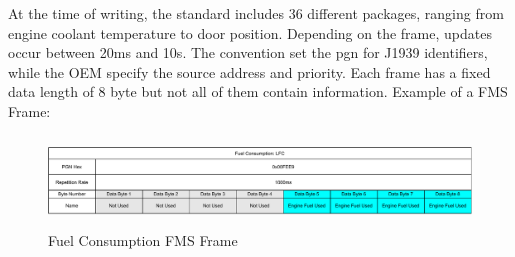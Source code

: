 At the time of writing, the standard includes 36 different packages, ranging from engine coolant temperature to door position.  Depending on the frame, updates occur between 20ms and 10s. The convention set the \acrfull{pgn} for J1939 identifiers, while the OEM specify the source address and priority. Each frame has a fixed data length of 8 byte but not all of them contain information. Example of a FMS Frame:

\begin{figure}[h!]
	\centering
	\hfuzz=11.0pt
	\includegraphics[height=2.4cm]{images/fms-frame}
	\caption{Fuel Consumption FMS Frame}
	\label{fig:fms-frame}
\end{figure}


